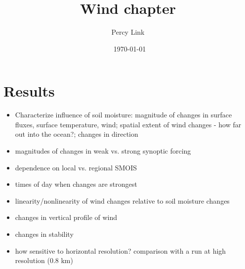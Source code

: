\documentclass[12pt]{amsart}
\title{Wind chapter}
\author{Percy Link}
\date{\currenttime \ \today} %
\begin{document}
\maketitle

\section{Results}


\begin{itemize}
\item Characterize influence of soil moisture: magnitude of changes in surface fluxes, surface temperature, wind; spatial extent of wind changes - how far out into the ocean?; changes in direction
\item magnitudes of changes in weak vs. strong synoptic forcing
\item dependence on local vs. regional SMOIS
\item times of day when changes are strongest
\item linearity/nonlinearity of wind changes relative to soil moisture changes
\item changes in vertical profile of wind
\item changes in stability
\item how sensitive to horizontal resolution? comparison with a run at high resolution (0.8 km)
\end{itemize}
\end{document}

